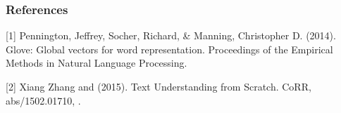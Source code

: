 \documentclass{article} %
\begin{document}
\subsubsection*{References}

\small{

[1] Pennington, Jeffrey, Socher, Richard, \& Manning, Christopher D. (2014). Glove: Global vectors for word representation. Proceedings of the Empirical Methods in Natural Language Processing.

[2] Xiang Zhang and (2015). Text Understanding from Scratch. CoRR, abs/1502.01710, .
}
\end{document}
